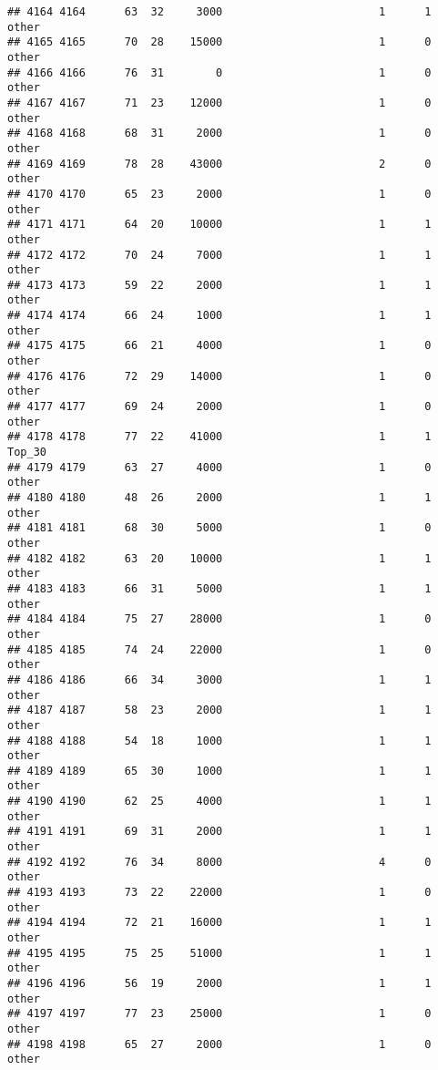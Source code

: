 \documentclass[
]{article}
\begin{document}
\begin{verbatim}
## 4164 4164      63  32     3000                        1      1    other
## 4165 4165      70  28    15000                        1      0    other
## 4166 4166      76  31        0                        1      0    other
## 4167 4167      71  23    12000                        1      0    other
## 4168 4168      68  31     2000                        1      0    other
## 4169 4169      78  28    43000                        2      0    other
## 4170 4170      65  23     2000                        1      0    other
## 4171 4171      64  20    10000                        1      1    other
## 4172 4172      70  24     7000                        1      1    other
## 4173 4173      59  22     2000                        1      1    other
## 4174 4174      66  24     1000                        1      1    other
## 4175 4175      66  21     4000                        1      0    other
## 4176 4176      72  29    14000                        1      0    other
## 4177 4177      69  24     2000                        1      0    other
## 4178 4178      77  22    41000                        1      1   Top_30
## 4179 4179      63  27     4000                        1      0    other
## 4180 4180      48  26     2000                        1      1    other
## 4181 4181      68  30     5000                        1      0    other
## 4182 4182      63  20    10000                        1      1    other
## 4183 4183      66  31     5000                        1      1    other
## 4184 4184      75  27    28000                        1      0    other
## 4185 4185      74  24    22000                        1      0    other
## 4186 4186      66  34     3000                        1      1    other
## 4187 4187      58  23     2000                        1      1    other
## 4188 4188      54  18     1000                        1      1    other
## 4189 4189      65  30     1000                        1      1    other
## 4190 4190      62  25     4000                        1      1    other
## 4191 4191      69  31     2000                        1      1    other
## 4192 4192      76  34     8000                        4      0    other
## 4193 4193      73  22    22000                        1      0    other
## 4194 4194      72  21    16000                        1      1    other
## 4195 4195      75  25    51000                        1      1    other
## 4196 4196      56  19     2000                        1      1    other
## 4197 4197      77  23    25000                        1      0    other
## 4198 4198      65  27     2000                        1      0    other

\end{verbatim}
\end{document}
